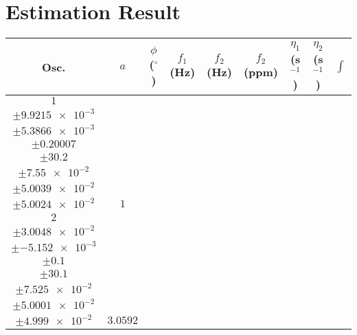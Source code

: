 \documentclass[8pt]{article}
\begin{document}
\section*{Estimation Result}
\begin{longtable}[l]{c c c c c c c c c}
\toprule
Osc. & $a$ & $\phi$ ($^{\circ}$) & $f_1$ (Hz) & $f_2$ (Hz) & $f_2$ (ppm) & $\eta_1$ (s$^{-1}$) & $\eta_2$ (s$^{-1}$) & $\int$\\
\midrule
$\num{1}$ & \begin{tabular}[c]{@{}c@{}}$\num{0.99215}$ \\ $\pm\num{9.9215e-3}$\end{tabular} & \begin{tabular}[c]{@{}c@{}}$\num{0.53866}$ \\ $\pm\num{5.3866e-3}$\end{tabular} & \begin{tabular}[c]{@{}c@{}}$\num{20.007}$ \\ $\pm\num{0.20007}$\end{tabular} & \begin{tabular}[c]{@{}c@{}}$\num{3.02e+3}$ \\ $\pm\num{30.2}$\end{tabular} & \begin{tabular}[c]{@{}c@{}}$\num{7.55}$ \\ $\pm\num{7.55e-2}$\end{tabular} & \begin{tabular}[c]{@{}c@{}}$\num{5.0039}$ \\ $\pm\num{5.0039e-2}$\end{tabular} & \begin{tabular}[c]{@{}c@{}}$\num{5.0024}$ \\ $\pm\num{5.0024e-2}$\end{tabular} & $\num{1}$\\
$\num{2}$ & \begin{tabular}[c]{@{}c@{}}$\num{3.0048}$ \\ $\pm\num{3.0048e-2}$\end{tabular} & \begin{tabular}[c]{@{}c@{}}$\num{-0.5152}$ \\ $\pm\num{-5.152e-3}$\end{tabular} & \begin{tabular}[c]{@{}c@{}}$\num{10}$ \\ $\pm\num{0.1}$\end{tabular} & \begin{tabular}[c]{@{}c@{}}$\num{3.01e+3}$ \\ $\pm\num{30.1}$\end{tabular} & \begin{tabular}[c]{@{}c@{}}$\num{7.525}$ \\ $\pm\num{7.525e-2}$\end{tabular} & \begin{tabular}[c]{@{}c@{}}$\num{5.0001}$ \\ $\pm\num{5.0001e-2}$\end{tabular} & \begin{tabular}[c]{@{}c@{}}$\num{4.999}$ \\ $\pm\num{4.999e-2}$\end{tabular} & $\num{3.0592}$\\

\end{longtable}
\end{document}

